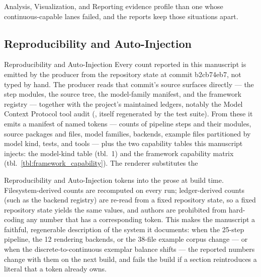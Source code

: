 \documentclass[
  ignorenonframetext,
]{beamer}
\begin{document}
\begin{frame}{Analysis, Visualization, and
Reporting}
evidence profile than one whose continuous-capable lanes failed, and the
reports keep those situations apart.
\end{frame}

\subsection{Reproducibility and
Auto-Injection}\label{reproducibility-and-auto-injection}

\begin{frame}{Reproducibility and
Auto-Injection}
Every count reported in this manuscript is emitted by the producer
 from the
repository state at commit b2cb74eb7, not typed by hand. The producer
reads that commit's source surfaces directly --- the step modules, the
source tree, the model-family manifest, and the framework registry ---
together with the project's maintained ledgers, notably the Model
Context Protocol tool audit (,
itself regenerated by the test suite). From these it emits a manifest of
named tokens --- counts of pipeline steps and their modules, source
packages and files, model families, backends, example files partitioned
by model kind, tests, and tools --- plus the two capability tables this
manuscript injects: the model-kind table (tbl.~1)
and the framework capability matrix
(tbl.~\ref{tbl:framework_capability}). The renderer substitutes the
\end{frame}

\begin{frame}{Reproducibility and
Auto-Injection}
tokens into the prose at build time. Filesystem-derived counts are
recomputed on every run; ledger-derived counts (such as the backend
registry) are re-read from a fixed repository state, so a fixed
repository state yields the same values, and authors are prohibited from
hard-coding any number that has a corresponding token. This makes the
manuscript a faithful, regenerable description of the system it
documents: when the 25-step pipeline, the 12 rendering backends, or the
38-file example corpus change --- or when the discrete-to-continuous
exemplar balance shifts --- the reported numbers change with them on the
next build, and  fails the
build if a section reintroduces a literal that a token already owns.
\end{frame}
\end{document}
